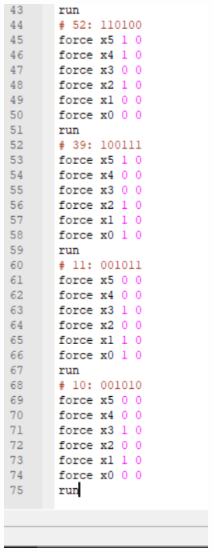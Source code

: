 \documentclass[]{article}
\begin{document}
\begin{minipage}{0.5\textwidth}
\begin{figure}[H]
	\centering
	\includegraphics[width=1\textwidth]{test_f1_2.png}
\end{figure}
\end{minipage}
\end{document}
